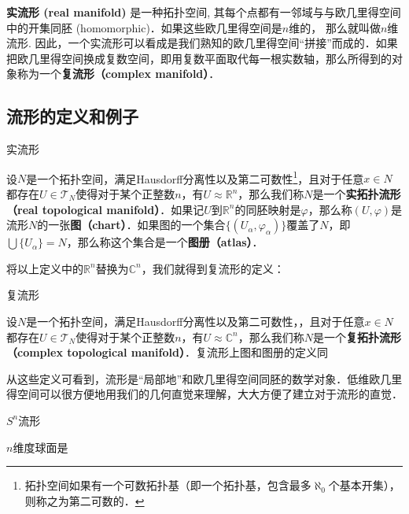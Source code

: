 

\textbf{实流形 (real manifold)} 是一种拓扑空间, 其每个点都有一邻域与与欧几里得空间中的开集同胚 (homomorphic)．如果这些欧几里得空间是$n$维的， 那么就叫做$n$维流形. 因此，一个实流形可以看成是我们熟知的欧几里得空间“拼接”而成的．如果把欧几里得空间换成复数空间，即用复数平面取代每一根实数轴，那么所得到的对象称为一个\textbf{复流形（complex manifold）}．

\subsection{流形的定义和例子}

\begin{definition}{实流形}

设$N$是一个拓扑空间，满足Hausdorff分离性以及第二可数性\footnote{拓扑空间如果有一个可数拓扑基（即一个拓扑基，包含最多$\aleph_0$个基本开集），则称之为第二可数的．}，且对于任意$x\in N$都存在$U\in\mathcal{T}_N$使得对于某个正整数$n$，有$U\approx\mathbb{R}^n$，那么我们称$N$是一个\textbf{实拓扑流形（real topological manifold）}．如果记$U$到$\mathbb{R}^n$的同胚映射是$\varphi$，那么称$(U, \varphi)$是流形$N$的一张\textbf{图（chart）}．如果图的一个集合$\{(U_\alpha, \varphi_\alpha)\}$覆盖了$N$，即$\bigcup\{U_\alpha\}=N$，那么称这个集合是一个\textbf{图册（atlas）}．

\end{definition}

将以上定义中的$\mathbb{R}^n$替换为$\mathbb{C}^n$，我们就得到复流形的定义：

\begin{definition}{复流形}

设$N$是一个拓扑空间，满足Hausdorff分离性以及第二可数性，，且对于任意$x\in N$都存在$U\in\mathcal{T}_N$使得对于某个正整数$n$，有$U\approx\mathbb{C}^n$，那么我们称$N$是一个\textbf{复拓扑流形（complex topological manifold）}．复流形上图和图册的定义同

\end{definition}

从这些定义可看到，流形是“局部地”和欧几里得空间同胚的数学对象．低维欧几里得空间可以很方便地用我们的几何直觉来理解，大大方便了建立对于流形的直觉．

\begin{example}{$S^n$流形}

$n$维度球面是

\end{example}


